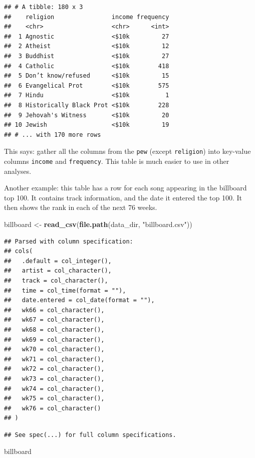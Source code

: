 \documentclass[12pt,]{book}
\newenvironment{Shaded}{\begin{snugshade}}{\end{snugshade}}
\newcommand{\KeywordTok}[1]{\textcolor[rgb]{0.13,0.29,0.53}{\textbf{#1}}}
\newcommand{\StringTok}[1]{\textcolor[rgb]{0.31,0.60,0.02}{#1}}
\newcommand{\NormalTok}[1]{#1}
\theoremstyle{definition}
\theoremstyle{definition}
\theoremstyle{definition}
\theoremstyle{remark}
\begin{document}
\begin{verbatim}
## # A tibble: 180 x 3
##    religion                income frequency
##    <chr>                   <chr>      <int>
##  1 Agnostic                <$10k         27
##  2 Atheist                 <$10k         12
##  3 Buddhist                <$10k         27
##  4 Catholic                <$10k        418
##  5 Don’t know/refused      <$10k         15
##  6 Evangelical Prot        <$10k        575
##  7 Hindu                   <$10k          1
##  8 Historically Black Prot <$10k        228
##  9 Jehovah's Witness       <$10k         20
## 10 Jewish                  <$10k         19
## # ... with 170 more rows
\end{verbatim}

This says: gather all the columns from the \texttt{pew} (except
\texttt{religion}) into key-value columns \texttt{income} and
\texttt{frequency}. This table is much easier to use in other analyses.

Another example: this table has a row for each song appearing in the
billboard top 100. It contains track information, and the date it
entered the top 100. It then shows the rank in each of the next 76
weeks.

\begin{Shaded}
\begin{Highlighting}[]
\NormalTok{billboard <-}\StringTok{ }\KeywordTok{read_csv}\NormalTok{(}\KeywordTok{file.path}\NormalTok{(data_dir, }\StringTok{"billboard.csv"}\NormalTok{))}
\end{Highlighting}
\end{Shaded}

\begin{verbatim}
## Parsed with column specification:
## cols(
##   .default = col_integer(),
##   artist = col_character(),
##   track = col_character(),
##   time = col_time(format = ""),
##   date.entered = col_date(format = ""),
##   wk66 = col_character(),
##   wk67 = col_character(),
##   wk68 = col_character(),
##   wk69 = col_character(),
##   wk70 = col_character(),
##   wk71 = col_character(),
##   wk72 = col_character(),
##   wk73 = col_character(),
##   wk74 = col_character(),
##   wk75 = col_character(),
##   wk76 = col_character()
## )
\end{verbatim}

\begin{verbatim}
## See spec(...) for full column specifications.
\end{verbatim}

\begin{Shaded}
\begin{Highlighting}[]
\NormalTok{billboard}
\end{Highlighting}
\end{Shaded}
\end{document}
